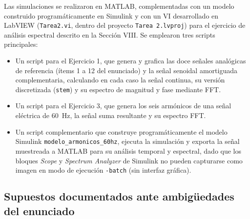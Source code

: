\documentclass[conference]{IEEEtran}
\begin{document}
Las simulaciones se realizaron en MATLAB, complementadas con un modelo construido programáticamente en Simulink y con un VI desarrollado en LabVIEW (\texttt{Tarea2.vi}, dentro del proyecto \texttt{Tarea 2.lvproj}) para el ejercicio de análisis espectral descrito en la Sección VIII. Se emplearon tres scripts principales:
\begin{itemize}
    \item Un script para el Ejercicio 1, que genera y grafica las doce señales analógicas de referencia (ítems 1 a 12 del enunciado) y la señal senoidal amortiguada complementaria, calculando en cada caso la señal continua, su versión discretizada (\texttt{stem}) y su espectro de magnitud y fase mediante FFT.
    \item Un script para el Ejercicio 3, que genera los seis armónicos de una señal eléctrica de 60~Hz, la señal suma resultante y su espectro FFT.
    \item Un script complementario que construye programáticamente el modelo Simulink \texttt{modelo\_armonicos\_60hz}, ejecuta la simulación y exporta la señal muestreada a MATLAB para su análisis temporal y espectral, dado que los bloques \textit{Scope} y \textit{Spectrum Analyzer} de Simulink no pueden capturarse como imagen en modo de ejecución \texttt{-batch} (sin interfaz gráfica).
\end{itemize}

\subsection{Supuestos documentados ante ambigüedades del enunciado}
\end{document}
